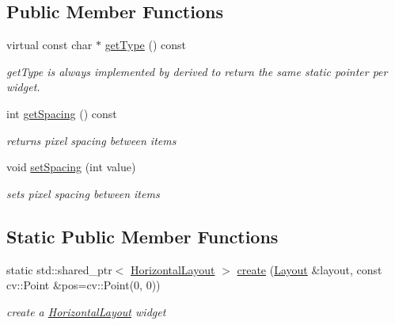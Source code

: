 \subsection*{Public Member Functions}
\begin{DoxyCompactItemize}
\item 
virtual const char $\ast$ \hyperlink{classcanvascv_1_1HorizontalLayout_a7ccafb8692a2a63eb645e9a9c6b2b9b8}{get\+Type} () const 
\begin{DoxyCompactList}\small\item\em get\+Type is always implemented by derived to return the same static pointer per widget. \end{DoxyCompactList}\item 
int \hyperlink{classcanvascv_1_1HorizontalLayout_aefc6e2cc382de2755233f599bacbed16}{get\+Spacing} () const \hypertarget{classcanvascv_1_1HorizontalLayout_aefc6e2cc382de2755233f599bacbed16}{}\label{classcanvascv_1_1HorizontalLayout_aefc6e2cc382de2755233f599bacbed16}

\begin{DoxyCompactList}\small\item\em returns pixel spacing between items \end{DoxyCompactList}\item 
void \hyperlink{classcanvascv_1_1HorizontalLayout_ad00d6013c170b992322d8d7bfb9e50db}{set\+Spacing} (int value)\hypertarget{classcanvascv_1_1HorizontalLayout_ad00d6013c170b992322d8d7bfb9e50db}{}\label{classcanvascv_1_1HorizontalLayout_ad00d6013c170b992322d8d7bfb9e50db}

\begin{DoxyCompactList}\small\item\em sets pixel spacing between items \end{DoxyCompactList}\end{DoxyCompactItemize}
\subsection*{Static Public Member Functions}
\begin{DoxyCompactItemize}
\item 
static std\+::shared\+\_\+ptr$<$ \hyperlink{classcanvascv_1_1HorizontalLayout}{Horizontal\+Layout} $>$ \hyperlink{classcanvascv_1_1HorizontalLayout_aea31dd787cbf985687ead6a55efa1839}{create} (\hyperlink{classcanvascv_1_1Layout}{Layout} \&layout, const cv\+::\+Point \&pos=cv\+::\+Point(0, 0))
\begin{DoxyCompactList}\small\item\em create a \hyperlink{classcanvascv_1_1HorizontalLayout}{Horizontal\+Layout} widget \end{DoxyCompactList}\end{DoxyCompactItemize}
